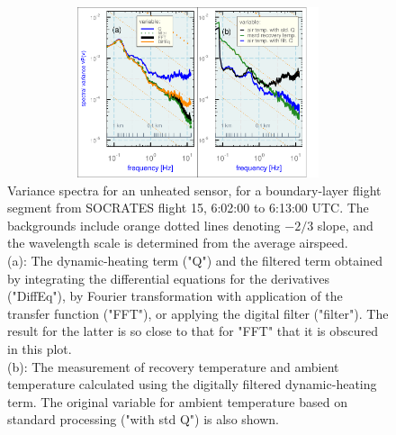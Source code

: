 \documentclass[amt, manuscript]{copernicus}
\begin{document}
\begin{figure}

\begin{center}\includegraphics[width=12cm,height=5cm]{figure/fig6} \end{center}

\caption[For an unheated sensor, variance spectra for the
dynamic-heating term after application of three different filters.
Also, variance spectra for the measurement of recovery temperature
and ambient temperature calculated using the filtered dynamic-heating
term. ]{Variance spectra for an unheated sensor, for a boundary-layer
flight segment from SOCRATES flight 15, 6:02:00 to 6:13:00 UTC.
The backgrounds include orange dotted lines denoting $-2/3$ slope,
and the wavelength scale is determined from the average airspeed.\protect \\
(a): The dynamic-heating term ("Q") and the filtered term
obtained by integrating the differential equations for the derivatives
("DiffEq"), by Fourier transformation with application of the
transfer function ("FFT"), or applying the digital filter ("filter").
The result for the latter is so close to that for "FFT" that it
is obscured in this plot.\protect \\ 
(b): The measurement of recovery temperature and ambient temperature
calculated using the digitally filtered dynamic-heating term. The original
variable for ambient temperature based on standard processing 
("with std Q") is also shown.{\label{fig:Integration}}}

\end{figure}
\end{document}
